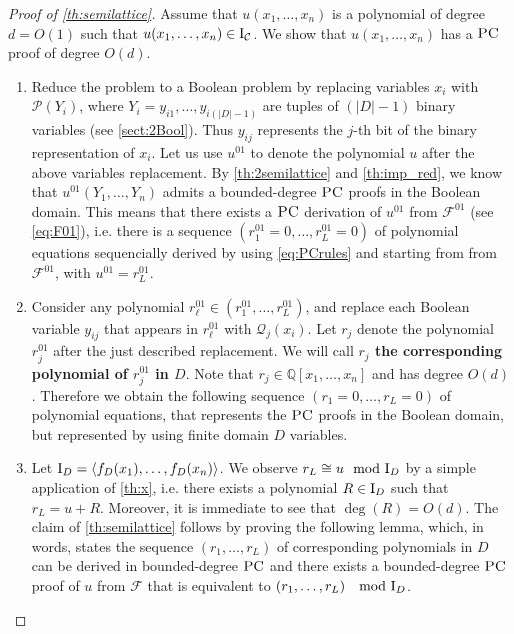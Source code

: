 \documentclass[11pt]{article}
\newcommand{\F}{\mathcal{F}}
\newcommand{\Cc}{\mathcal{C}}
\newcommand{\PC}{\textsc{PC}}
\newcommand{\I}{\emph{$\rm{I}$}}
\newcommand{\1}{\textbf{1}}
\newcommand{\Field}{\mathbb{Q}}
\newcommand\p{\mathcal{P}}
\newcommand\q{\mathcal{Q}}
\newcommand\uval{{(|D|-1)}}
\begin{document}
\begin{proof} [Proof of \cref{th:semilattice}]
    Assume that $u(x_1,\ldots,x_n)$ is a polynomial of degree $d=O(1)$ such that  $u(x_1,\ldots,x_n)\in \I_\Cc$. We show that $u(x_1,\ldots,x_n)$ has a $\PC$ proof of degree $O(d)$.
    \begin{enumerate}
        \item Reduce the problem to a Boolean problem by replacing variables $x_i$ with $\p(Y_i)$, where $Y_i = y_{i1}, \dots, y_{i\uval}$ are tuples of $\uval$ binary variables (see \cref{sect:2Bool}). Thus $y_{ij}$ represents the $j$-th bit of the binary representation of $x_i$. Let us use $u^{01}$ to denote the polynomial $u$ after the above variables replacement. By \cref{th:2semilattice} and \cref{th:imp_red}, we know that $u^{01}(Y_1,\ldots,Y_n)$ admits a bounded-degree $\PC$ proofs in the Boolean domain. This means that there exists a {$\PC$ derivation} of $u^{01}$ from $\F^{01}$ (see \cref{eq:F01}), i.e. there is a sequence $(r_1^{01}=0,\ldots,r_L^{01}=0)$ of polynomial equations sequencially derived by using \eqref{eq:PCrules} and starting from from $\F^{01}$, with $u^{01}=r_L^{01}$.
        \item\label{def_corr} Consider any polynomial $r^{01}_\ell\in (r_1^{01},\ldots,r_L^{01})$, and replace each Boolean variable $y_{ij}$ that appears in $r^{01}_\ell$ with $\q_j(x_i)$.  Let $r_j$ denote the polynomial $r_j^{01}$ after the just described replacement.
        We will call \textbf{$r_j$ the corresponding polynomial of $r_j^{01}$ in $D$}.
        Note that $r_j\in \Field[x_1, \ldots, x_n]$ and has degree $O(d)$. Therefore we obtain the following sequence $(r_1=0,\ldots,r_L=0)$ of polynomial equations, that represents the $\PC$ proofs in the Boolean domain, but represented by using finite domain $D$ variables.
        \item Let $\I_D=\langle f_D(x_1),\ldots,f_D(x_n)\rangle$. We observe $r_L \cong u \mod{\I_D}$ by a simple application of \cref{th:x}, i.e. there exists a polynomial $R \in \I_D$ such that $r_L = u + R$. Moreover, it is immediate to see that $\deg(R) = O(d)$. The claim of \cref{th:semilattice} follows by proving the following lemma, which, in words, states the sequence $(r_1, \dots, r_L)$ of corresponding polynomials in $D$ can be derived in bounded-degree $\PC$ and there exists a bounded-degree $\PC$ proof of $u$ from $\mathcal{F}$ that is equivalent to $(r_1, \dots, r_L) \ \mod{\I_D}$. 
    \end{enumerate}


\end{proof}
\end{document}
